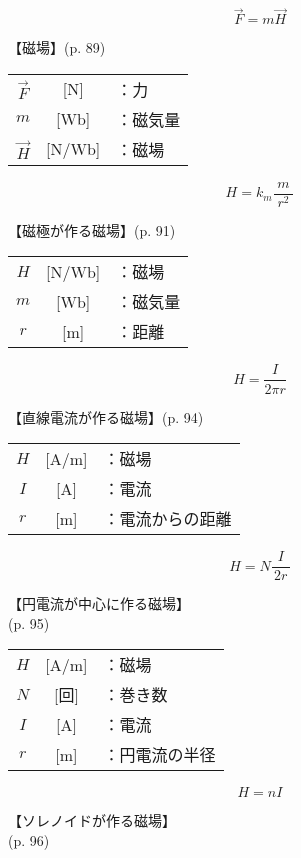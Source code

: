 \documentclass[10pt]{jarticle}
\begin{document}
\newpage
\[
\vec{F} = m \vec{H}
\]


\vskip3mm
【磁場】{\footnotesize (p. 89)}

\begin{tabular}{ccl}
$\vec{F}$	&[N]	&：力 \\
$m$	&[Wb]	&：磁気量 \\
$\vec{H}$	&[N/Wb]	&：磁場
\end{tabular}






\newpage
\[
H = k_m \frac{m}{\; r^2 \;}
\]


\vskip3mm
【磁極が作る磁場】{\footnotesize (p. 91)}

\begin{tabular}{ccl}
$H$	&[N/Wb]	&：磁場 \\
$m$	&[Wb]	&：磁気量 \\
$r$	&[m]	&：距離
\end{tabular}





\newpage
\[
H = \frac{I}{2 \pi r}
\]


\vskip3mm
【直線電流が作る磁場】{\footnotesize (p. 94)}

\begin{tabular}{ccl}
$H$	&[A/m]	&：磁場 \\
$I$	&[A]	&：電流 \\
$r$	&[m]	&：電流からの距離
\end{tabular}




\newpage
\[
H = N \frac{I}{\, 2 r \,}
\]


\vskip3mm
【円電流が中心に作る磁場】\\
\hfill {\footnotesize (p. 95)}

\begin{tabular}{ccl}
$H$	&[A/m]	&：磁場 \\
$N$	&[回]	&：巻き数 \\
$I$	&[A]	&：電流 \\
$r$	&[m]	&：円電流の半径
\end{tabular}





\newpage
\[
H = n I
\]


\vskip3mm
【ソレノイドが作る磁場】\\
\hfill {\footnotesize (p. 96)}
\end{document}
